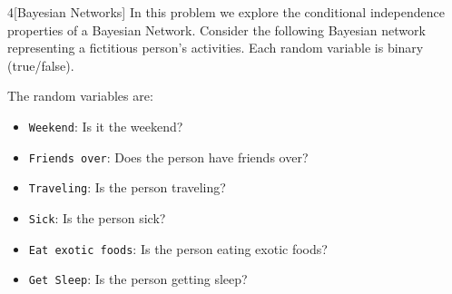 \documentclass[expanded]{lkx_pset}
\providecommand{\attr}[1]{\texttt{#1}}
\begin{document}
\begin{problem}{4}[Bayesian Networks]
In this problem we explore the conditional independence
properties of a Bayesian Network.
Consider the following Bayesian
network representing a fictitious person's activities. Each random
variable is binary (true/false).

\medskip

\begin{center}
\end{center}

The random variables are:

\begin{itemize}
	\item \attr{Weekend}: Is it the weekend?
	\item \attr{Friends over}: Does the person have friends over?
	\item \attr{Traveling}: Is the person traveling?
	\item \attr{Sick}: Is the person sick?
	\item \attr{Eat exotic foods}: Is the person eating exotic foods?
	\item \attr{Get Sleep}: Is the person getting sleep?
\end{itemize}
\end{problem}
\end{document}
